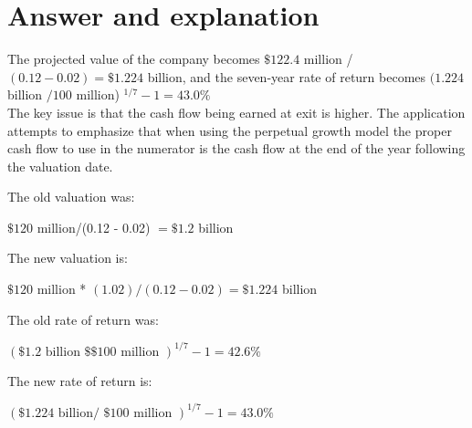\documentclass[11pt]{article}
\begin{document}
\section*{Answer and explanation}
The projected value of the company becomes $\$ 122.4$ million / $(0.12-0.02)=\$ 1.224$ billion, and the seven-year rate of return becomes $(1.224$ billion $/ 100$ million) ${ }^{1 / 7}-1=43.0 \%$\\
The key issue is that the cash flow being earned at exit is higher. The application attempts to emphasize that when using the perpetual growth model the proper cash flow to use in the numerator is the cash flow at the end of the year following the valuation date.

The old valuation was:

$\$ 120$ million/(0.12 - 0.02) $=\$ 1.2$ billion

The new valuation is:

$\$ 120$ million * $(1.02) /(0.12-0.02)=\$ 1.224$ billion

The old rate of return was:

$(\$ 1.2 \text { billion } \$ \$ 100 \text { million })^{1 / 7}-1=42.6 \%$

The new rate of return is:

$(\$ 1.224 \text { billion/ } \$ 100 \text { million })^{1 / 7}-1=43.0 \%$
\end{document}
